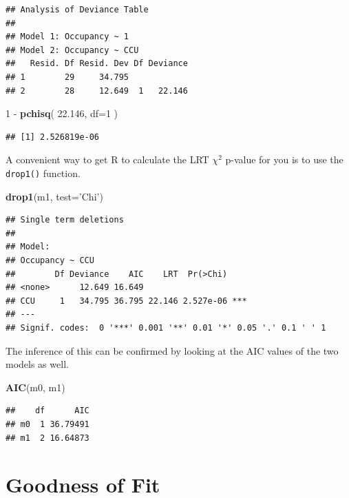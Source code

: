 \documentclass[]{book}
\newenvironment{Shaded}{\begin{snugshade}}{\end{snugshade}}
\newcommand{\KeywordTok}[1]{\textcolor[rgb]{0.13,0.29,0.53}{\textbf{{#1}}}}
\newcommand{\DataTypeTok}[1]{\textcolor[rgb]{0.13,0.29,0.53}{{#1}}}
\newcommand{\DecValTok}[1]{\textcolor[rgb]{0.00,0.00,0.81}{{#1}}}
\newcommand{\FloatTok}[1]{\textcolor[rgb]{0.00,0.00,0.81}{{#1}}}
\newcommand{\StringTok}[1]{\textcolor[rgb]{0.31,0.60,0.02}{{#1}}}
\newcommand{\NormalTok}[1]{{#1}}
\theoremstyle{definition}
\theoremstyle{definition}
\theoremstyle{remark}
\begin{document}
\begin{verbatim}
## Analysis of Deviance Table
## 
## Model 1: Occupancy ~ 1
## Model 2: Occupancy ~ CCU
##   Resid. Df Resid. Dev Df Deviance
## 1        29     34.795            
## 2        28     12.649  1   22.146
\end{verbatim}

\begin{Shaded}
\begin{Highlighting}[]
\DecValTok{1} \NormalTok{-}\StringTok{ }\KeywordTok{pchisq}\NormalTok{( }\FloatTok{22.146}\NormalTok{, }\DataTypeTok{df=}\DecValTok{1} \NormalTok{)}
\end{Highlighting}
\end{Shaded}

\begin{verbatim}
## [1] 2.526819e-06
\end{verbatim}

A convenient way to get R to calculate the LRT \(\chi^{2}\) p-value for
you is to use the \texttt{drop1()} function.

\begin{Shaded}
\begin{Highlighting}[]
\KeywordTok{drop1}\NormalTok{(m1, }\DataTypeTok{test=}\StringTok{'Chi'}\NormalTok{)}
\end{Highlighting}
\end{Shaded}

\begin{verbatim}
## Single term deletions
## 
## Model:
## Occupancy ~ CCU
##        Df Deviance    AIC    LRT  Pr(>Chi)    
## <none>      12.649 16.649                     
## CCU     1   34.795 36.795 22.146 2.527e-06 ***
## ---
## Signif. codes:  0 '***' 0.001 '**' 0.01 '*' 0.05 '.' 0.1 ' ' 1
\end{verbatim}

The inference of this can be confirmed by looking at the AIC values of
the two models as well.

\begin{Shaded}
\begin{Highlighting}[]
\KeywordTok{AIC}\NormalTok{(m0, m1)}
\end{Highlighting}
\end{Shaded}

\begin{verbatim}
##    df      AIC
## m0  1 36.79491
## m1  2 16.64873
\end{verbatim}

\section{Goodness of Fit}\label{goodness-of-fit}
\end{document}
